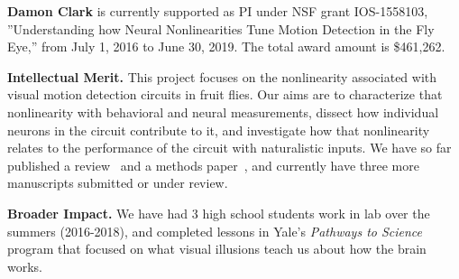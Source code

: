 \vskip10pt
\textbf{Damon Clark} is currently supported as PI under NSF grant IOS-1558103,
''Understanding how Neural Nonlinearities Tune Motion Detection in the Fly Eye,'' from July 1, 2016 to June 30, 2019. The total award amount is \$461,262.

{\bf Intellectual Merit.}
This project focuses on the nonlinearity associated with visual motion detection circuits in fruit flies. Our aims are to characterize that nonlinearity with behavioral and neural measurements, dissect how individual neurons in the circuit contribute to it, and investigate how that nonlinearity relates to the performance of the circuit with naturalistic inputs. We have so far published a review~\citep{clark:16} and a methods paper~\citep{mano:17}, and currently have three more manuscripts submitted or under review.

{\bf Broader Impact.}
We have had 3 high school students work in lab over the summers (2016-2018), and completed lessons in Yale's \textit{Pathways to Science} program that focused on what visual illusions teach us about how the brain works.